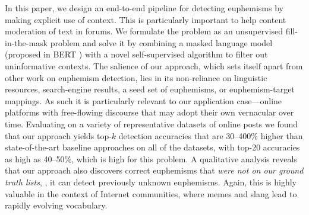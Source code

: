 In this paper, we design an end-to-end pipeline for detecting euphemisms by making explicit use of context. 
This is particularly important to help content moderation of text in forums. 
We formulate the problem as an unsupervised fill-in-the-mask problem \cite{devlin2019bert,donahue2020enabling} and solve it by combining a masked language model (proposed in BERT \cite{devlin2019bert}) with a novel self-supervised algorithm to filter out uninformative contexts.
The salience of our approach, which sets itself apart from other work on euphemism detection, lies in its non-reliance on linguistic resources, search-engine results, a seed set of euphemisms, or euphemism-target mappings. 
As such it is particularly relevant to our application case---online
platforms with free-flowing discourse that may adopt their own 
vernacular over time. 
Evaluating on a variety of representative datasets of online posts
we found that our approach yields  top-$k$ detection accuracies that are 30--400\% higher than state-of-the-art baseline approaches on all of the datasets, with top-20 accuracies as high as 40--50\%, which is high for this problem. 
A qualitative analysis reveals that our approach also discovers correct euphemisms that {\em were not on our ground truth lists}, \ie, it can 
detect previously unknown euphemisms. 
Again, this is highly valuable in the context of 
Internet communities, where memes 
and slang lead to rapidly evolving vocabulary.

